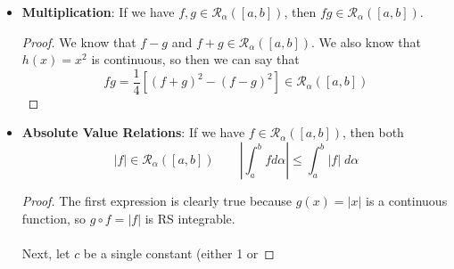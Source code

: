 \documentclass[12pt]{article}
\theoremstyle{plain}
\theoremstyle{definition}
\theoremstyle{remark}
\begin{document}
\begin{itemize}
\begin{proof}
            line, and relate it back to Expression \ref{forf}.
            We know that by our definition of $B$:
            \begin{align*}
                {2K}{\delta} \sum_{i\in B} 
                \Delta\alpha_i &\leq    
                \sum_{i\in B} \left[M_i(f) - m_i(f) \right]
                \Delta\alpha_i \leq \varepsilon\cdot\delta \\
                &\Rightarrow \qquad \sum_{i\in B} \Delta\alpha_i
                \leq \frac{\varepsilon}{2K}
            \end{align*}
            Substituting this result back into Equation    
            \ref{final}, we see that we must have
            \begin{align*}
                U_\alpha(g\circ f,P) - L_\alpha(g\circ f,P)
                &\leq \frac{\varepsilon}{2[\alpha(b)-\alpha(a)]}    
                    [\alpha(b)-\alpha(a)]
                    + K\frac{\varepsilon}{2K} \\
                    &\leq \frac{\varepsilon}{2} + 
                        \frac{\varepsilon}{2} = \varepsilon
            \end{align*}
            Thus, we have that $g\circ 
            f\in\mathscr{R}_\alpha([a,b])$.
        \end{proof}
    \item \textbf{Multiplication}: If we have 
        $f,g\in\mathscr{R}_\alpha([a,b])$, then 
        $fg\in\mathscr{R}_\alpha([a,b])$.
        \begin{proof}
            We know that $f - g$ and $f+g \in
            \mathscr{R}_\alpha([a,b])$. We also know that 
            $h(x) = x^2$ is continuous, so then we can say that
            \[ fg = \frac{1}{4} \left[(f+g)^2 - (f-g)^2 \right]
                \in\mathscr{R}_\alpha([a,b])
                \]
        \end{proof}
    \item \textbf{Absolute Value Relations}: If we have
        $f \in \mathscr{R}_\alpha([a,b])$, then both
        \[ |f| \in \mathscr{R}_\alpha([a,b]) \qquad
            \left\lvert\int^b_a f d\alpha \right\rvert
            \leq \int^b_a |f| \; d\alpha \]
        \begin{proof}
            The first expression is clearly true because $g(x)=|x|$
            is a continuous function, so $g\circ f = |f|$ is
            RS integrable.
            \\
            \\
            Next, let $c$ be a single constant (either 1 or 

\end{proof}
\end{itemize}
\end{document}
